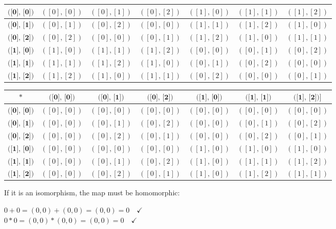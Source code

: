 \documentclass{article} %
\begin{document}
\begin{addmargin}[1em]{0em}
\begin{tabular}{|c | c | c | c | c | c | c|}
$\textbf{([0], [0])}$ & $([0], [0])$ & $([0], [1])$ & $([0], [2])$ & $([1], [0])$ & $([1], [1])$ & $([1], [2])$\\ \hline
$\textbf{([0], [1])}$ & $([0], [1])$ & $([0], [2])$ & $([0], [0])$ & $([1], [1])$ & $([1], [2])$ & $([1], [0])$\\ \hline
$\textbf{([0], [2])}$ & $([0], [2])$ & $([0], [0])$ & $([0], [1])$ & $([1], [2])$ & $([1], [0])$ & $([1], [1])$\\ \hline
$\textbf{([1], [0])}$ & $([1], [0])$ & $([1], [1])$ & $([1], [2])$ & $([0], [0])$ & $([0], [1])$ & $([0], [2])$\\ \hline
$\textbf{([1], [1])}$ & $([1], [1])$ & $([1], [2])$ & $([1], [0])$ & $([0], [1])$ & $([0], [2])$ & $([0], [0])$\\ \hline
$\textbf{([1], [2])}$ & $([1], [2])$ & $([1], [0])$ & $([1], [1])$ & $([0], [2])$ & $([0], [0])$ & $([0], [1])$\\
\hline
\end{tabular}
\begin{tabular}{|c | c | c | c | c | c | c|}
\hline
$*$ & $\textbf{([0], [0])}$ & $\textbf{([0], [1])}$ & $\textbf{([0], [2])}$ & $\textbf{([1], [0])}$ & $\textbf{([1], [1])}$ & $\textbf{([1], [2])]}$\\ \hline
$\textbf{([0], [0])}$ & $([0], [0])$ & $([0], [0])$ & $([0], [0])$ & $([0], [0])$ & $([0], [0])$ & $([0], [0])$\\ \hline
$\textbf{([0], [1])}$ & $([0], [0])$ & $([0], [1])$ & $([0], [2])$ & $([0], [0])$ & $([0], [1])$ & $([0], [2])$\\ \hline
$\textbf{([0], [2])}$ & $([0], [0])$ & $([0], [2])$ & $([0], [1])$ & $([0], [0])$ & $([0], [2])$ & $([0], [1])$\\ \hline
$\textbf{([1], [0])}$ & $([0], [0])$ & $([0], [0])$ & $([0], [0])$ & $([1], [0])$ & $([1], [0])$ & $([1], [0])$\\ \hline
$\textbf{([1], [1])}$ & $([0], [0])$ & $([0], [1])$ & $([0], [2])$ & $([1], [0])$ & $([1], [1])$ & $([1], [2])$\\ \hline
$\textbf{([1], [2])}$ & $([0], [0])$ & $([0], [2])$ & $([0], [1])$ & $([1], [0])$ & $([1], [2])$ & $([1], [1])$\\
\hline
\end{tabular}
\hfill \break
If it is an isomorphism, the map must be homomorphic:
\begin{multicols}{2}
$0 + 0 = (0,0) + (0,0) = (0,0) = 0 \quad \checkmark$
\\$0 * 0 = (0,0) * (0,0) = (0,0) = 0 \quad \checkmark$

\end{multicols}
\end{addmargin}
\end{document}
